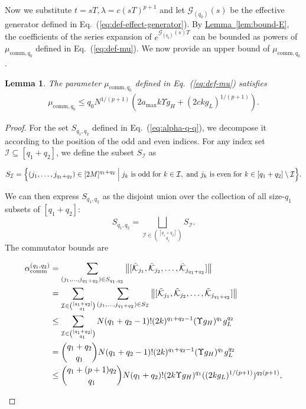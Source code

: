 \documentclass[aps,pra,reprint,groupedaddress,floatfix]{revtex4-2}
\newtheorem{lemma}{Lemma}
\newcommand{\eq}[1]{(\ref{eq:#1})}
\newcommand{\lem}[1]{\hyperref[lem:#1]{Lemma~\ref*{lem:#1}}}
\newcommand{\G}{\mathcal{G}}
\newcommand{\mc}{\mathcal}
\begin{document}
Now we substitute $t = sT, \lambda = c (sT)^{p+1}$ and let $\G_{(q_0)}(s)$ be the effective generator defined in Eq.~\eq{def-effect-generator}. By \lem{bound-E}, the coefficients of the series expansion of $e^{\G_{(q_0)}(s)T}$ can be bounded as powers of $\mu_{\mathrm{comm},q_0}$ defined in Eq.~\eq{def-mu}. We now provide an upper bound of $\mu_{\mathrm{comm},q_0}$. 
\begin{lemma}
\label{lem:bound-mu}
    The parameter $\mu_{\mathrm{comm},q_0}$ defined in Eq.~\eq{def-mu} satisfies \begin{align*}
        \mu_{\mathrm{comm},q_0} \le q_0 N^{1/(p+1)}(2a_{\max}k \Upsilon g_H+ (2ckg_L)^{1/(p+1)}).
    \end{align*}
\end{lemma}
\begin{proof}
    For the set $S_{q_1, q_2}$ defined in Eq.~\eq{alpha-q-q}, we decompose it according to the position of the odd and even indices.  For any index set $\mathcal{I} \subseteq [q_1+q_2]$, we define the subset $S_{\mathcal{I}}$ as
    \begin{widetext}
    \[
    S_{\mathcal{I}} = \Bigl\{ (j_1, \ldots, j_{q_1+q_2}) \in [2M]^{q_1+q_2} \Bigm| 
        j_k \text{ is odd for } k \in \mathcal{I}, \text{ and } 
        j_k \text{ is even for } k \in [q_1+q_2] \setminus \mathcal{I}
    \Bigr\}.
    \]
    \end{widetext}
    We can then express $S_{q_1, q_2}$ as the disjoint union over the collection of all size-$q_1$ subsets of $[q_1+q_2]$:
    \[
    S_{q_1, q_2} = \bigsqcup_{\mathcal{I} \in \binom{[q_1+q_2]}{q_1}} S_{\mathcal{I}}.
    \]
    The commutator bounds are
    \begin{widetext}
    \begin{align*}
    \alpha_{\rm comm}^{(q_1,q_2)} &=  \sum_{(j_1, \ldots, j_{q_1+q_2})\in S_{q_1, q_2}}\big\|[\tilde{\mc K}_{j_1}, \tilde{\mc K}_{j_2},\ldots,\tilde{\mc K}_{j_{q_1+q_2}}]\big\|\\
    &= \sum_{\mc I\in \binom{[q_1+q_2]}{q_1}}\sum_{(j_1, \ldots, j_{q_1+q_2})\in S_{\mc I}}\big\|[\tilde{\mc K}_{j_1}, \tilde{\mc K}_{j_2},\ldots,\tilde{\mc K}_{j_{q_1+q_2}}]\big\|\\
    &\le \sum_{\mc I\in \binom{[q_1+q_2]}{q_1}} N(q_1+q_2-1)!(2k)^{q_1+q_2-1}(\Upsilon g_H)^{q_1}g_L^{q_2}\\
    &= \binom{q_1+q_2}{q_1}N(q_1+q_2-1)!(2k)^{q_1+q_2-1}(\Upsilon g_H)^{q_1}g_L^{q_2}\\
    &\le \binom{q_1+(p+1)q_2}{q_1}N(q_1+q_2)!(2k\Upsilon g_H)^{q_1}((2kg_L)^{1/(p+1)})^{q_2(p+1)},

\end{align*}
\end{widetext}
\end{proof}
\end{document}
